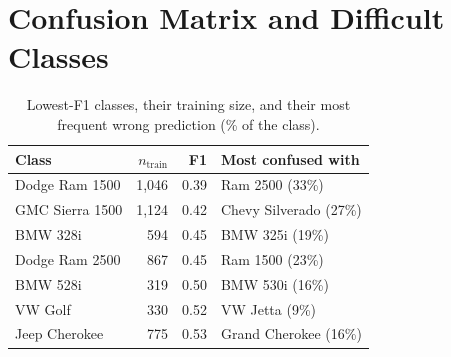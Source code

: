 \documentclass[10pt,a4paper,twocolumn]{article}
\begin{document}
\section{Confusion Matrix and Difficult Classes}
\begin{table}[h]
\centering\small
\caption{Lowest-F1 classes, their training size, and their most frequent wrong prediction (\% of the class).}\label{tab:hard}
\begin{tabular}{@{}lrrl@{}}
\toprule
Class & $n_\text{train}$ & F1 & Most confused with \\
\midrule
Dodge Ram 1500   & 1,046 & 0.39 & Ram 2500 (33\%) \\
GMC Sierra 1500  & 1,124 & 0.42 & Chevy Silverado (27\%) \\
BMW 328i         &   594 & 0.45 & BMW 325i (19\%) \\
Dodge Ram 2500   &   867 & 0.45 & Ram 1500 (23\%) \\
BMW 528i         &   319 & 0.50 & BMW 530i (16\%) \\
VW Golf          &   330 & 0.52 & VW Jetta (9\%) \\
Jeep Cherokee    &   775 & 0.53 & Grand Cherokee (16\%) \\
\bottomrule
\end{tabular}
\end{table}
\end{document}
